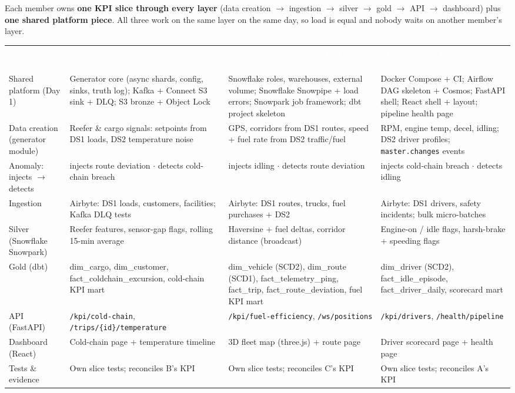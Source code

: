 \documentclass[10pt,a4paper]{article}
\newcommand{\thead}[1]{\textcolor{white}{\bfseries #1}}
\begin{document}
{\footnotesize Each member owns \textbf{one KPI slice through every layer} (data creation $\rightarrow$ ingestion $\rightarrow$ silver $\rightarrow$ gold $\rightarrow$ API $\rightarrow$ dashboard) plus \textbf{one shared platform piece}. All three work on the same layer on the same day, so load is equal and nobody waits on another member's layer.\par}
\vspace{3pt}
{\scriptsize
{}
\begin{tabularx}{\linewidth}{@{}>{\raggedright\arraybackslash}p{2.05cm}YYY@{}}
\thead{Layer} & \thead{Member A · Cold-chain slice} & \thead{Member B · Route \& fuel slice} & \thead{Member C · Driver safety slice} \\
Shared platform (Day 1) & Generator core (async shards, config, sinks, truth log); Kafka + Connect S3 sink + DLQ; S3 bronze + Object Lock & Snowflake roles, warehouses, external volume; Snowflake Snowpipe + load errors; Snowpark job framework; dbt project skeleton & Docker Compose + CI; Airflow DAG skeleton + Cosmos; FastAPI shell; React shell + layout; pipeline health page \\
Data creation (generator module) & Reefer \& cargo signals: setpoints from DS1 loads, DS2 temperature noise & GPS, corridors from DS1 routes, speed + fuel rate from DS2 traffic/fuel & RPM, engine temp, decel, idling; DS2 driver profiles; \texttt{master.changes} events \\
Anomaly: injects $\rightarrow$ detects & injects route deviation $\cdot$ detects cold-chain breach & injects idling $\cdot$ detects route deviation & injects cold-chain breach $\cdot$ detects idling \\
Ingestion & Airbyte: DS1 loads, customers, facilities; Kafka DLQ tests & Airbyte: DS1 routes, trucks, fuel purchases + DS2 & Airbyte: DS1 drivers, safety incidents; bulk micro-batches \\
Silver (Snowflake Snowpark) & Reefer features, sensor-gap flags, rolling 15-min average & Haversine + fuel deltas, corridor distance (broadcast) & Engine-on / idle flags, harsh-brake + speeding flags \\
Gold (dbt) & dim\_cargo, dim\_customer, fact\_coldchain\_excursion, cold-chain KPI mart & dim\_vehicle (SCD2), dim\_route (SCD1), fact\_telemetry\_ping, fact\_trip, fact\_route\_deviation, fuel KPI mart & dim\_driver (SCD2), fact\_idle\_episode, fact\_driver\_daily, scorecard mart \\
API (FastAPI) & \texttt{/kpi/cold-chain}, \texttt{/trips/\{id\}/temperature} & \texttt{/kpi/fuel-efficiency}, \texttt{/ws/positions} & \texttt{/kpi/drivers}, \texttt{/health/pipeline} \\
Dashboard (React) & Cold-chain page + temperature timeline & 3D fleet map (three.js) + route page & Driver scorecard page + health page \\
Tests \& evidence & Own slice tests; reconciles B's KPI & Own slice tests; reconciles C's KPI & Own slice tests; reconciles A's KPI \\
\end{tabularx}}
\end{document}
